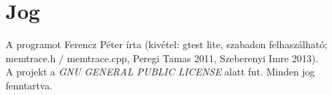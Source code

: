 
\chapter{Jog}
A programot Ferencz Péter írta (kivétel: gtest lite, szabadon felhaszálható; memtrace.h / memtrace.cpp, Peregi Tamas 2011, Szeberenyi Imre 2013). \\
A projekt a \textit{GNU GENERAL PUBLIC LICENSE} alatt fut. Minden jog fenntartva.


